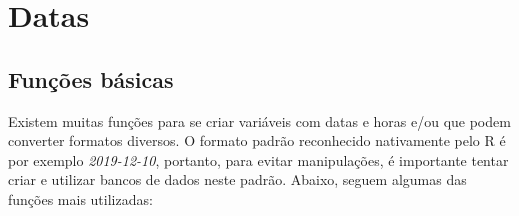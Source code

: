 \documentclass[
]{book}
\theoremstyle{definition}
\theoremstyle{definition}
\theoremstyle{definition}
\theoremstyle{definition}
\theoremstyle{remark}
\begin{document}
\hypertarget{datas}{%
\chapter{Datas}\label{datas}}

\hypertarget{funuxe7uxf5es-buxe1sicas}{%
\section{Funções básicas}\label{funuxe7uxf5es-buxe1sicas}}

Existem muitas funções para se criar variáveis com datas e horas e/ou que podem converter formatos diversos. O formato padrão reconhecido nativamente pelo R é por exemplo \emph{2019-12-10}, portanto, para evitar manipulações, é importante tentar criar e utilizar bancos de dados neste padrão. Abaixo, seguem algumas das funções mais utilizadas:
\end{document}
